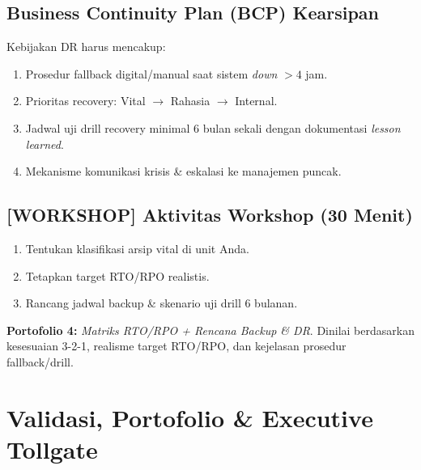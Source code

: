 \documentclass[12pt,a4paper]{report}
\begin{document}
\section{Business Continuity Plan (BCP) Kearsipan}
Kebijakan DR harus mencakup:
\begin{enumerate}[leftmargin=*]
    \item Prosedur fallback digital/manual saat sistem \textit{down} $>4$ jam.
    \item Prioritas recovery: Vital $\rightarrow$ Rahasia $\rightarrow$ Internal.
    \item Jadwal uji drill recovery minimal 6 bulan sekali dengan dokumentasi \textit{lesson learned}.
    \item Mekanisme komunikasi krisis \& eskalasi ke manajemen puncak.
\end{enumerate}

\section*{[WORKSHOP] Aktivitas Workshop (30 Menit)}
\begin{enumerate}[leftmargin=*]
    \item Tentukan klasifikasi arsip vital di unit Anda.
    \item Tetapkan target RTO/RPO realistis.
    \item Rancang jadwal backup \& skenario uji drill 6 bulanan.
\end{enumerate}

\begin{outputbox}
[DONE] \textbf{Portofolio 4:} \textit{Matriks RTO/RPO + Rencana Backup \& DR}. Dinilai berdasarkan kesesuaian 3-2-1, realisme target RTO/RPO, dan kejelasan prosedur fallback/drill.
\end{outputbox}

\newpage
\chapter{Validasi, Portofolio \& Executive Tollgate}
\end{document}

